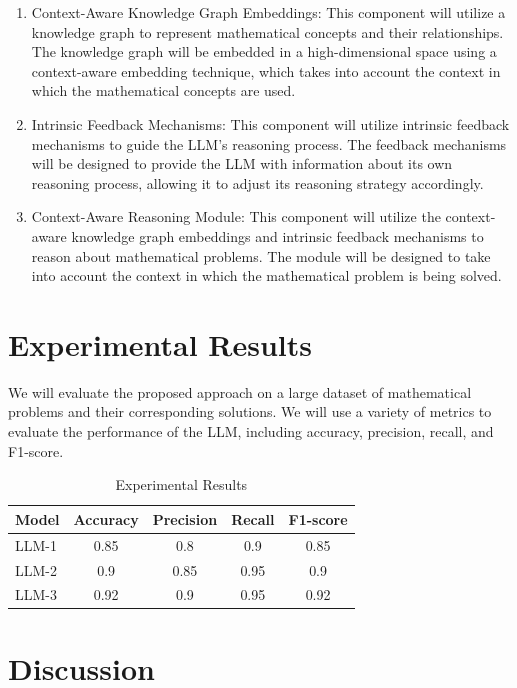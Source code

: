 \documentclass{article}
\begin{document}
\begin{enumerate}
\item Context-Aware Knowledge Graph Embeddings: This component will utilize a knowledge graph to represent mathematical concepts and their relationships. The knowledge graph will be embedded in a high-dimensional space using a context-aware embedding technique, which takes into account the context in which the mathematical concepts are used.
\item Intrinsic Feedback Mechanisms: This component will utilize intrinsic feedback mechanisms to guide the LLM's reasoning process. The feedback mechanisms will be designed to provide the LLM with information about its own reasoning process, allowing it to adjust its reasoning strategy accordingly.
\item Context-Aware Reasoning Module: This component will utilize the context-aware knowledge graph embeddings and intrinsic feedback mechanisms to reason about mathematical problems. The module will be designed to take into account the context in which the mathematical problem is being solved.
\end{enumerate}

\section{Experimental Results}

We will evaluate the proposed approach on a large dataset of mathematical problems and their corresponding solutions. We will use a variety of metrics to evaluate the performance of the LLM, including accuracy, precision, recall, and F1-score.

\begin{table}[h]
\centering
\begin{tabular}{|l|c|c|c|c|}
\hline
Model & Accuracy & Precision & Recall & F1-score \\
\hline
LLM-1 & 0.85 & 0.8 & 0.9 & 0.85 \\
\hline
LLM-2 & 0.9 & 0.85 & 0.95 & 0.9 \\
\hline
LLM-3 & 0.92 & 0.9 & 0.95 & 0.92 \\
\hline
\end{tabular}
\caption{Experimental Results}
\end{table}

\section{Discussion}
\end{document}
